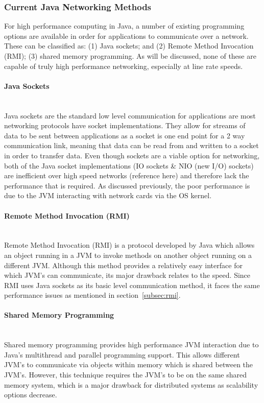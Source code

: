 \documentclass[a4paper, titlepage]{article}
\begin{document}
\subsubsection{Current Java Networking Methods}
For high performance computing in Java, a number of existing programming options are available in order for applications to communicate over a network. These can be classified as: (1) Java sockets; and (2) Remote Method Invocation (RMI); (3) shared memory programming. As will be discussed, none of these are capable of truly high performance networking, especially at line rate speeds.

\paragraph{Java Sockets}\mbox{}\\ %
Java sockets are the standard low level communication for applications are most networking protocols have socket implementations. They allow for streams of data to be sent between applications as a socket is one end point for a 2 way communication link, meaning that data can be read from and written to a socket in order to transfer data. Even though sockets are a viable option for networking, both of the Java socket implementations (IO sockets \& NIO (new I/O) sockets) are inefficient over high speed networks (reference here) and therefore lack the performance that is required. As discussed previously, the poor performance is due to the JVM interacting with network cards via the OS kernel.

\paragraph{Remote Method Invocation (RMI)}\mbox{}\\ %
\label{subsec:rmi}
Remote Method Invocation (RMI) is a protocol developed by Java which allows an object running in a JVM to invoke methods on another object running on a different JVM. Although this method provides a relatively easy interface for which JVM's can communicate, its major drawback relates to the speed. Since RMI uses Java sockets as its basic level communication method, it faces the same performance issues as mentioned in section~\ref{subsec:rmi}.

\paragraph{Shared Memory Programming}\mbox{}\\ %
Shared memory programming provides high performance JVM interaction due to Java's multithread and parallel programming support. This allows different JVM's to communicate via objects within memory which is shared between the JVM's. However, this technique requires the JVM's to be on the same shared memory system, which is a major drawback for distributed systems as scalability options decrease. \\
\end{document}

